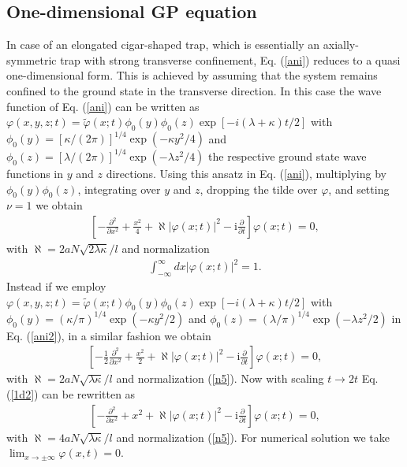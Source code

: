 \documentclass[onecolumn]{elsart3p}
\begin{document}
\subsection{One-dimensional GP equation}

In case of an elongated cigar-shaped trap, which is essentially an
axially-symmetric trap with strong transverse  confinement,  Eq.
(\ref{ani}) reduces to a quasi one-dimensional form. This is achieved by
assuming that the system remains confined to the ground state in the
transverse direction.  In this case the wave function of Eq.
(\ref{ani}) can be written as $\varphi(x,y,z;t) =\tilde \varphi(x;t)
\phi_0(y)
\phi_0(z)\exp[-i(\lambda+\kappa)t/2]$ with $\phi_0(y)=
[\kappa/(2\pi)]^{1/4} \exp(-\kappa y^2/4)$ and $\phi_0(z)=
[\lambda/(2\pi)]^{1/4} \exp(-\lambda z^2/4)$ the respective ground state
wave functions in $y$ and $z$ directions. Using this ansatz in Eq.
(\ref{ani}), multiplying by $\phi_0(y)\phi_0(z)$, integrating over
$y$ and $z$,  dropping the tilde over $\varphi$, and setting $\nu=1$  we
obtain
\begin{align}
\left[-\frac{\partial^2}
{\partial x^2}+\frac{x^2}{4}+\aleph %
\left| {\varphi(x;t)}
\right| ^2
-\mbox{i}\frac{\partial }{\partial t}
\right] \varphi (x;t)=0  ,
\label{1d}
\end{align}
with $\aleph %
= 2a N \sqrt {2
\lambda \kappa} /l$ and
 normalization
\begin{align}\label{n5}
\int_{-\infty}^\infty dx |\varphi(x;t)|^2 =1.
\end{align}
Instead if we employ
 $\varphi(x,y,z;t) =\tilde  \varphi(x;t) \phi_0(y)
\phi_0(z)\exp[-i(\lambda+\kappa)t/2]$ with $\phi_0(y)=
(\kappa/\pi)^{1/4} \exp(-\kappa y^2/2)$ and $\phi_0(z)=
(\lambda/\pi)^{1/4} \exp(-\lambda z^2/2)$
 in Eq.
(\ref{ani2}), in a similar fashion
 we obtain
\begin{align}
\left[-\frac{1}{2}\frac{\partial^2}
{\partial x^2}+\frac{x^2}{2}+\aleph  %
\left| {\varphi(x;t)}
\right| ^2
-\mbox{i}\frac{\partial }{\partial t}
\right] \varphi (x;t)=0  ,
\label{1d2}
\end{align}
with $\aleph  %
= 2a N \sqrt {
\lambda \kappa} /l$ and normalization (\ref{n5}). Now with scaling
$t\to 2t$ Eq. (\ref{1d2}) can be rewritten as
\begin{align}
\left[-\frac{\partial^2}
{\partial x^2}+{x^2}+\aleph  %
\left| {\varphi(x;t)}
\right| ^2
-\mbox{i}\frac{\partial }{\partial t}
\right] \varphi (x;t)=0  ,
\label{1d3}
\end{align}
with $\aleph  %
= 4a N \sqrt {
\lambda \kappa} /l$ and normalization (\ref{n5}).
For numerical solution we take $\lim_{x\to \pm \infty}\varphi(x,t)=0$.
\end{document}
